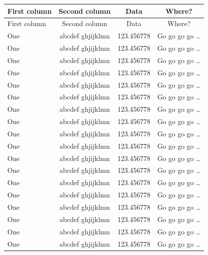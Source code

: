 \documentclass[phd]{ndsu-thesis-2022}
\begin{document}
{
\setlength{\LTleft}{1mm plus -1fill}%
\setlength{\LTright}{\LTleft}%
\singlespacing
\begin{longtable}{l c c c }%
        \toprule
	First column & Second column & Data & Where?\\
        \midrule
        \endfirsthead 

        \midrule
	First column & Second column & Data & Where?\\
        \midrule
        \endhead
One & abcdef ghjijklmn & 123.456778  & Go go go go \ldots \\
One & abcdef ghjijklmn & 123.456778  & Go go go go \ldots \\
One & abcdef ghjijklmn & 123.456778  & Go go go go \ldots \\
One & abcdef ghjijklmn & 123.456778  & Go go go go \ldots \\
One & abcdef ghjijklmn & 123.456778  & Go go go go \ldots \\
One & abcdef ghjijklmn & 123.456778  & Go go go go \ldots \\
One & abcdef ghjijklmn & 123.456778  & Go go go go \ldots \\
One & abcdef ghjijklmn & 123.456778  & Go go go go \ldots \\
One & abcdef ghjijklmn & 123.456778  & Go go go go \ldots \\
One & abcdef ghjijklmn & 123.456778  & Go go go go \ldots \\
One & abcdef ghjijklmn & 123.456778  & Go go go go \ldots \\
One & abcdef ghjijklmn & 123.456778  & Go go go go \ldots \\
One & abcdef ghjijklmn & 123.456778  & Go go go go \ldots \\
One & abcdef ghjijklmn & 123.456778  & Go go go go \ldots \\
One & abcdef ghjijklmn & 123.456778  & Go go go go \ldots \\
One & abcdef ghjijklmn & 123.456778  & Go go go go \ldots \\
One & abcdef ghjijklmn & 123.456778  & Go go go go \ldots \\
One & abcdef ghjijklmn & 123.456778  & Go go go go \ldots \\

\end{longtable}}
\end{document}
